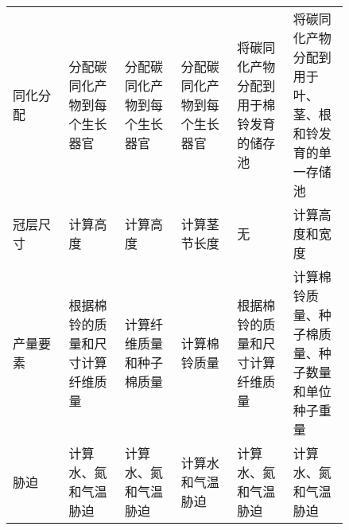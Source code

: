 \documentclass[a4paper,zihao=5]{ctexbook}
\begin{document}
\begin{table}
\begin{tabular}{p{0.14\linewidth}p{0.14\linewidth}p{0.14\linewidth}p{0.14\linewidth}p{0.14\linewidth}p{0.14\linewidth}}
        同化分配   & 分配碳同化产物到每个生长器官                                                 & 分配碳同化产物到每个生长器官                                                 & 分配碳同化产物到每个生长器官                                             & 将碳同化产物分配到用于棉铃发育的储存池                                     & 将碳同化产物分配到用于叶、茎、根和铃发育的单一存储池                                             \\
        冠层尺寸   & 计算高度                                                                     & 计算高度                                                                     & 计算茎节长度                                                             & 无                                                                         & 计算高度和宽度                                                                                   \\
        产量要素   & 根据棉铃的质量和尺寸计算纤维质量                                             & 计算纤维质量和种子棉质量                                                     & 计算棉铃质量                                                             & 根据棉铃的质量和尺寸计算纤维质量                                           & 计算棉铃质量、种子棉质量、种子数量和单位种子重量                                                 \\
        胁迫       & 计算水、氮和气温胁迫                                                         & 计算水、氮和气温胁迫                                                         & 计算水和气温胁迫                                                         & 计算水、氮和气温胁迫                                                       & 计算水、氮和气温胁迫                                                                             \\
        \bottomrule
    \end{tabular}
\end{table}
\end{document}
